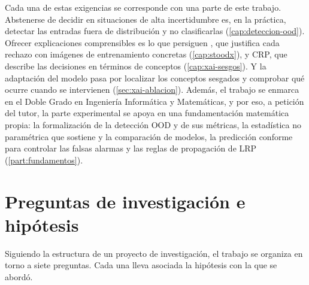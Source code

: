 Cada una de estas exigencias se corresponde con una parte de este trabajo. Abstenerse de decidir en situaciones de alta incertidumbre es, en la práctica, detectar las entradas fuera de distribución y no clasificarlas (\cref{cap:deteccion-ood}). Ofrecer explicaciones comprensibles es lo que persiguen \stoodx, que justifica cada rechazo con imágenes de entrenamiento concretas (\cref{cap:stoodx}), y CRP, que describe las decisiones en términos de conceptos (\cref{cap:xai-sesgos}). Y la adaptación del modelo pasa por localizar los conceptos sesgados y comprobar qué ocurre cuando se intervienen (\cref{sec:xai-ablacion}). Además, el trabajo se enmarca en el Doble Grado en Ingeniería Informática y Matemáticas, y por eso, a petición del tutor, la parte experimental se apoya en una fundamentación matemática propia: la formalización de la detección OOD y de sus métricas, la estadística no paramétrica que sostiene \stoodx y la comparación de modelos, la predicción conforme para controlar las falsas alarmas y las reglas de propagación de LRP (\cref{part:fundamentos}).

\section{Preguntas de investigación e hipótesis}\label{sec:preguntas}

Siguiendo la estructura de un proyecto de investigación, el trabajo se organiza en torno a siete preguntas. Cada una lleva asociada la hipótesis con la que se abordó.

